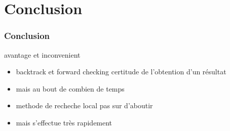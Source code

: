 \documentclass[10pt,a4paper]{beamer}
\begin{document}
\section{Conclusion}
\begin{frame}
	\frametitle{Conclusion}

	\begin{block}{avantage et inconvenient}
	      \begin{itemize}
		      \item{backtrack et forward checking certitude de l'obtention d'un résultat}
		      \item{mais au bout de combien de temps}
		      \item{methode de recheche local pas sur d'aboutir}
		      \item{mais s'effectue très rapidement}
	      \end{itemize}
		
	\end{block}


\end{frame}
\end{document}
